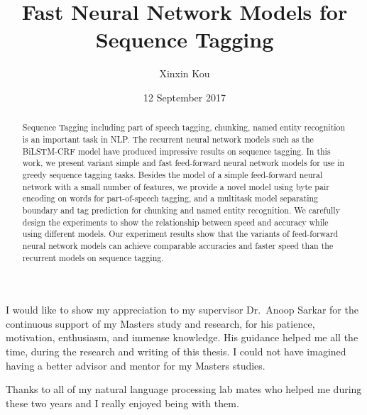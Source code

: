 \documentclass{sfuthesis}
\title{Fast Neural Network Models for Sequence Tagging}
\author{Xinxin Kou}
\date{12 September 2017}
\begin{document}
\frontmatter
\maketitle{}
\makecommittee{}

\begin{abstract}
Sequence Tagging including part of speech tagging, chunking, named entity recognition is an important task in NLP. The recurrent neural network models such as the BiLSTM-CRF model have produced impressive results on sequence tagging. In this work, we present variant simple and fast feed-forward neural network models for use in greedy sequence tagging tasks. Besides the model of a simple feed-forward neural network with a small number of features, we provide a novel model using byte pair encoding on words for part-of-speech tagging, and a multitask model separating boundary and tag prediction for chunking and named entity recognition. We carefully design the experiments to show the relationship between speed and accuracy while using different models. Our experiment results show that the variants of feed-forward neural network models can achieve comparable accuracies and faster speed than the recurrent models on sequence tagging.
\end{abstract}


\begin{acknowledgements} %

I would like to show my appreciation to my supervisor Dr.\ Anoop Sarkar for the continuous support of my Masters study and research, for his patience, motivation, enthusiasm, and immense knowledge. His guidance helped me all the time, during the research and writing of this thesis. I could not have imagined having a better advisor and mentor for my Masters studies.

Thanks to all of my natural language processing lab mates who helped me during these two years and I really enjoyed being with them. 


\end{acknowledgements}

\tableofcontents\clearpage
{}\listoftables\clearpage
{}\listoffigures





%
%
\end{document}
